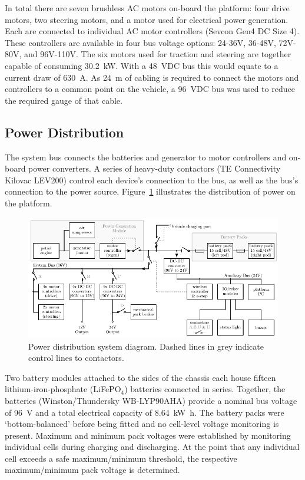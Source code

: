 \documentclass[preprint,authoryear,12pt]{elsarticle}
\begin{document}
        In total there are seven brushless AC motors on-board the platform: four drive motors, two steering motors, and a motor used for electrical power generation.
        Each are connected to individual AC motor controllers (Sevcon Gen4 DC Size 4).
        These controllers are available in four bus voltage options: 24-36V, 36-48V, 72V-80V, and 96V-110V.
        The six motors used for traction and steering are together capable of consuming \SI{30.2}{\kilo\watt}.
        With a \SI{48}{\volt}DC bus this would equate to a current draw of \SI{630}{\ampere}.
        As \SI{24}{\meter} of cabling is required to connect the motors and controllers to a common point on the vehicle, a \SI{96}{\volt}DC bus was used to reduce the required gauge of that cable.


    \subsection{Power Distribution}
    \label{sub:power}
        The system bus connects the batteries and generator to motor controllers and on-board power converters.
        A series of heavy-duty contactors (TE Connectivity Kilovac LEV200) control each device's connection to the bus, as well as the bus's connection to the power source.
        Figure~\ref{fig:power_system_diagram} illustrates the distribution of power on the platform.

        \begin{figure}[htb]
            \centering
            \includegraphics[width=\linewidth]{imgs/system_diagram/full-system-diagram_v1.pdf}
            \caption{Power distribution system diagram. Dashed lines in grey indicate control lines to contactors.}
            \label{fig:power_system_diagram}
        \end{figure}

        Two battery modules attached to the sides of the chassis each house fifteen lithium-iron-phosphate (LiFePO$_{\text{4}}$) batteries connected in series.
        Together, the batteries (Winston/Thundersky WB-LYP90AHA) provide a nominal bus voltage of \SI{96}{\volt} and a total electrical capacity of \SI{8.64}{\kilo\watt\hour}.
        The battery packs were `bottom-balanced' before being fitted and no cell-level voltage monitoring is present.
        Maximum and minimum pack voltages were established by monitoring individual cells during charging and discharging.
        At the point that any individual cell exceeds a safe maximum/minimum threshold, the respective maximum/minimum pack voltage is determined.
\end{document}

